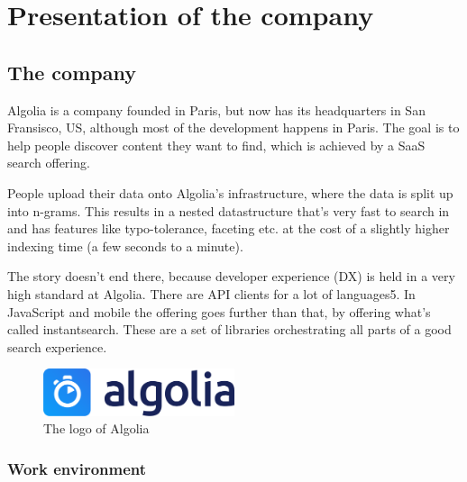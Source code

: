 
\chapter{Presentation of the company} %
\label{chp:presentation}

\section{The company} %
\label{sec:company}

Algolia\cite{algolia-home} is a company founded in Paris, but now has its headquarters in San Fransisco, US, although most of the development happens in Paris. The goal is to help people discover content they want to find, which is achieved by a SaaS search offering.

People upload their data onto Algolia’s infrastructure, where the data is split up into n-grams\cite{kimbrell1988searching}. This results in a nested datastructure that’s very fast to search in and has features like typo-tolerance, faceting etc. at the cost of a slightly higher indexing time (a few seconds to a minute).\cite{paris-nlp-algolia}

The story doesn’t end there, because developer experience (DX) is held in a very high standard at Algolia. There are API clients for a lot of languages5. In JavaScript and mobile the offering goes further than that, by offering what’s called instantsearch\cite{instantsearch-js}\cite{react-instantsearch}\cite{instantsearch-android}\cite{instantsearch-ios}. These are a set of libraries orchestrating all parts of a good search experience.

\begin{figure}[H]
  \label{figure:company-logo}
  \centering
  \includegraphics[width=0.5\textwidth]{../assets/algolia-logo-light.pdf}
  \caption{The logo of Algolia \cite{algolia-press}}
\end{figure}

\subsection{Work environment}
\label{sub:work-environment}

\lipsum[1]

